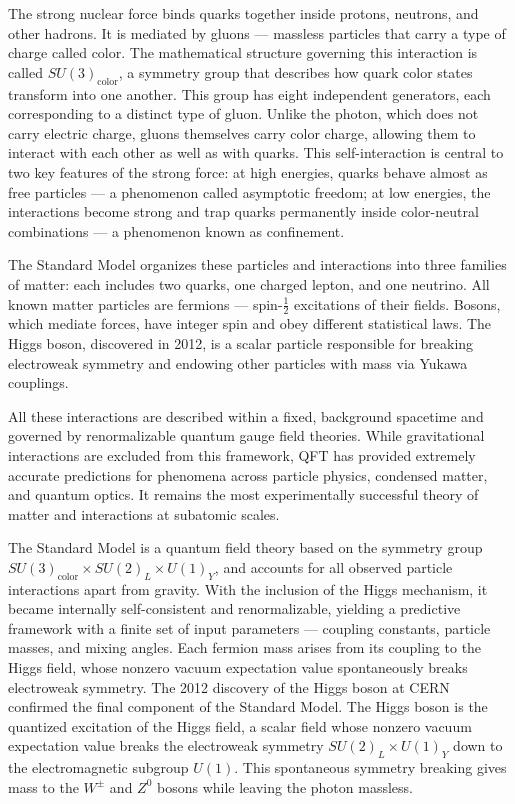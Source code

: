 The strong nuclear force binds quarks together inside protons, neutrons, and other hadrons. It is mediated by gluons — massless particles that carry a type of charge called color. The mathematical structure governing this interaction is called \(SU(3)_\text{color}\), a symmetry group that describes how quark color states transform into one another. This group has eight independent generators, each corresponding to a distinct type of gluon. Unlike the photon, which does not carry electric charge, gluons themselves carry color charge, allowing them to interact with each other as well as with quarks. This self-interaction is central to two key features of the strong force: at high energies, quarks behave almost as free particles — a phenomenon called asymptotic freedom; at low energies, the interactions become strong and trap quarks permanently inside color-neutral combinations — a phenomenon known as confinement.


The Standard Model organizes these particles and interactions into three families of matter: each includes two quarks, one charged lepton, and one neutrino. All known matter particles are fermions — spin-$\frac{1}{2}$ excitations of their fields. Bosons, which mediate forces, have integer spin and obey different statistical laws. The Higgs boson, discovered in 2012, is a scalar particle responsible for breaking electroweak symmetry and endowing other particles with mass via Yukawa couplings.

All these interactions are described within a fixed, background spacetime and governed by renormalizable quantum gauge field theories. While gravitational interactions are excluded from this framework, QFT has provided extremely accurate predictions for phenomena across particle physics, condensed matter, and quantum optics. It remains the most experimentally successful theory of matter and interactions at subatomic scales.

The Standard Model is a quantum field theory based on the symmetry group $SU(3)_\text{color} \times SU(2)_L \times U(1)_Y$, and accounts for all observed particle interactions apart from gravity. With the inclusion of the Higgs mechanism, it became internally self-consistent and renormalizable, yielding a predictive framework with a finite set of input parameters — coupling constants, particle masses, and mixing angles. Each fermion mass arises from its coupling to the Higgs field, whose nonzero vacuum expectation value spontaneously breaks electroweak symmetry.
The 2012 discovery of the Higgs boson at CERN confirmed the final component of the Standard Model. The Higgs boson is the quantized excitation of the Higgs field, a scalar field whose nonzero vacuum expectation value breaks the electroweak symmetry \(SU(2)_L\times U(1)_Y\) down to the electromagnetic subgroup \(U(1)\). This spontaneous symmetry breaking gives mass to the \(W^\pm\) and \(Z^0\) bosons while leaving the photon massless.

